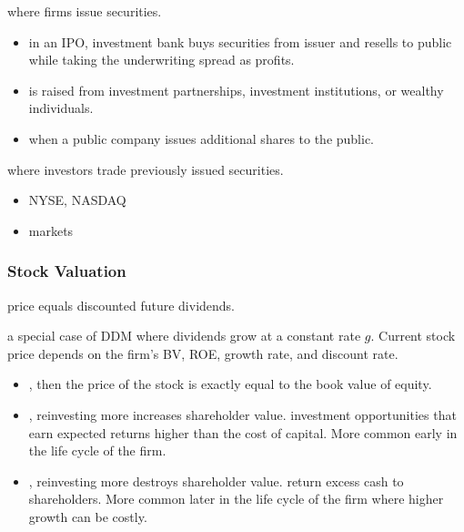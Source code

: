  where firms issue securities.
\begin{itemize}
    \item {} in an IPO, investment bank buys securities from issuer and resells to public while taking the underwriting spread as profits.
    \item {} is raised from investment partnerships, investment institutions, or wealthy individuals.
    \item {} when a public company issues additional shares to the public.
\end{itemize}

 where investors trade previously issued securities.
\begin{itemize}
    \item {} \eg NYSE, NASDAQ
    \item {} markets
\end{itemize}

\subsubsection{Stock Valuation}

 price equals discounted future dividends.

 a special case of DDM where dividends grow at a constant rate $g$.
Current stock price depends on the firm's BV, ROE, growth rate, and discount rate.
\begin{itemize}
    \item {}, then the price of the stock is exactly equal to the book value of equity.
    \item {}, reinvesting more increases shareholder value.  \ie investment
        opportunities that earn expected returns higher than the cost of capital. More common early in the life cycle of
        the firm.
    \item {}, reinvesting more destroys shareholder value.  \ie return
        excess cash to shareholders. More common later in the life cycle of the firm where higher growth can be costly.
\end{itemize}

